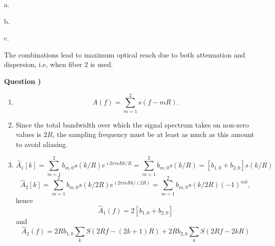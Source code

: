 \documentclass[10pt,letterpaper]{article}
\newcounter{QuestionNumber}
\newcommand{\Q}{
\textbf{Question \theQuestionNumber)}
\stepcounter{QuestionNumber}
}
\begin{document}
a.


b.


c.

The combinations
lead to maximum optical reach due to both attenuation and dispersion, i.e, when fiber 2 is used.

\Q


\begin{enumerate}[label=\alph*.]
\item
$$
A(f)=\sum_{m=1}^2 s(f-mR).
$$
\item
Since the total bandwidth over which the signal spectrum takes on non-zero values is $2R$, the sampling frequency must be at least as much as this amount to avoid aliasing.
\item
$$
\hat A_1[k]=
\sum_{m=1}^2 b_{m,0}s(k/R)e^{\imath 2\pi mR k/R}
=
\sum_{m=1}^2 b_{m,0}s(k/R)
=
[b_{1,0}+b_{2,0}]s(k/R)
$$
$$
\hat A_2[k]=
\sum_{m=1}^2 b_{m,0}s(k/2R)e^{\imath 2\pi mR k/(2R)}
=
\sum_{m=1}^2 b_{m,0}s(k/2R)(-1)^{mk},
$$
hence
$$
\hat A_1(f)=2[b_{1,0}+b_{2,0}]
$$
and
$$
\hat A_2(f)=2Rb_{1,0}\sum_k S(2Rf-(2k+1)R)
+
2Rb_{2,0}\sum_k S(2Rf-2kR)
$$
\end{enumerate}
\end{document}
